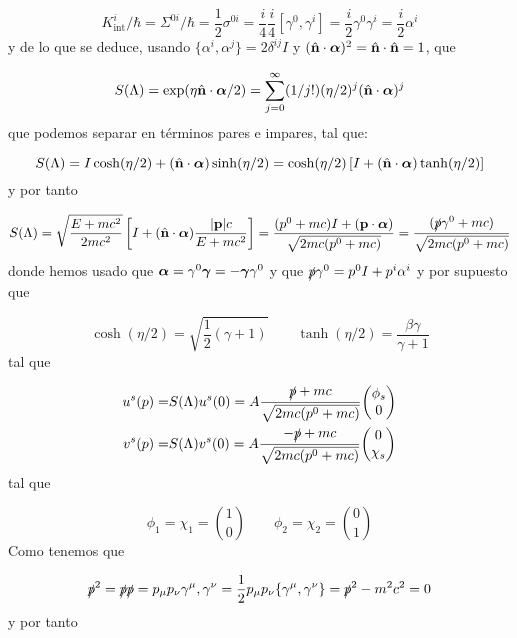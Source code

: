 \begin{equation}
	K_{\text{int}}^i / \hbar = \Sigma^{0i}/\hbar = \frac{1}{2} \sigma^{0i}=\frac{i}{4} \frac{i}{4}[\gamma^0,\gamma^i] = \frac{i}{2}\gamma^0\gamma^i = \frac{i}{2}\alpha^i
\end{equation}
y de lo que se deduce, usando $\{\alpha^i,\alpha^j\}=2\delta^{ij} I$ y $(\hat{\mathbf{n}}\cdot\boldsymbol{\alpha})^2=\hat{\mathbf{n}}\cdot\hat{\mathbf{n}}=1$, que

\begin{equation}
	S(\Lambda)=\exp(\eta\hat{\mathbf{n}}\cdot\boldsymbol{\alpha}/2)=\sum_{j=0}^\infty (1/j!)(\eta/2)^j (\hat{\mathbf{n}}\cdot\boldsymbol{\alpha})^j
\end{equation}
que podemos separar en términos pares e impares, tal que:

\begin{equation}
	S(\Lambda)=I\cosh(\eta/2)+(\hat{\mathbf{n}}\cdot\boldsymbol{\alpha})\sinh(\eta/2)=\cosh(\eta/2)\left[ I+(\hat{\mathbf{n}}\cdot\boldsymbol{\alpha})\tanh(\eta/2) \right]
\end{equation}
y por tanto

\begin{equation}
	S(\Lambda)=\sqrt{\frac{E+mc^2}{2mc^2}}\left[ I+(\hat{\mathbf{n}}\cdot\boldsymbol{\alpha}) \frac{\abs{\mathbf{p}}c}{E+mc^2} \right]= \frac{(p^0+mc)I+(\mathbf{p}\cdot\boldsymbol{\alpha})}{\sqrt{2mc(p^0+mc)}}= \frac{(\slashed{p} \gamma^0 + mc)}{\sqrt{2mc(p^0+mc)}}
\end{equation}
donde hemos usado que $\boldsymbol{\alpha}=\gamma^0 \boldsymbol{\gamma}=-\boldsymbol{\gamma}\gamma^0$ y que $\slashed{p}\gamma^0 = p^0 I + p^i \alpha^i$ y por supuesto que

\begin{equation}
	\cosh (\eta/2)=\sqrt{\frac{1}{2}(\gamma+1)} \qquad \tanh(\eta/2) = \frac{\beta \gamma}{\gamma+1}
\end{equation}
tal que 

\begin{equation}
	\begin{split}
		u^s(p) = & S(\Lambda)u^s(0) = A \frac{\pbar  + mc}{\sqrt{2mc(p^0+mc)}} \mqty(\phi_s\\0) \\
		v^s(p) = & S(\Lambda)v^s(0) = A \frac{-\pbar  + mc}{\sqrt{2mc(p^0+mc)}} \mqty(0\\ \chi_{s})
	\end{split}
\end{equation}
tal que 

\begin{equation}
	\phi_1 = \chi_1 =  \binom{1}{0}  \qquad \phi_2= \chi_2=\binom{0}{1}
\end{equation}
Como tenemos que

\begin{equation}
	\slashed{p}^2=\slashed{p}\slashed{p} = p_\mu p_\nu \gamma^\mu,\gamma^\nu=  \frac{1}{2}p_\mu p_\nu \{\gamma^\mu,\gamma^\nu\} = \slashed{p}^2 - m^2c^2=0
\end{equation}
y por tanto

